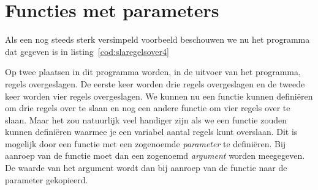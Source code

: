 


 
\section{Functies met parameters} 
Als een nog steeds sterk versimpeld voorbeeld beschouwen we nu het programma dat gegeven is in listing~\ref{cod:slaregelsover4}


Op twee plaatsen in dit programma worden, in de uitvoer van het programma, regels overgeslagen.
De eerste keer worden drie regels overgeslagen en de tweede keer worden vier regels overgeslagen.
We kunnen nu een functie kunnen definiëren om drie regels over te slaan en nog een andere functie om vier regels over te slaan.
Maar het zou natuurlijk veel handiger zijn als we een functie zouden kunnen definiëren waarmee je een variabel aantal regels kunt overslaan.
Dit is mogelijk door een functie met een zogenoemde \textsl{parameter} te definiëren.
Bij aanroep van de functie moet dan een zogenoemd \textsl{argument} worden meegegeven.
De waarde van het argument wordt dan bij aanroep van de functie naar de parameter gekopieerd.

